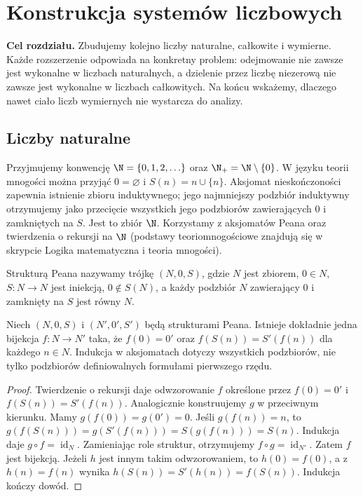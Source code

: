 \chapter{Konstrukcja systemów liczbowych}
\label{ma1:ch:number-systems}
\textbf{Cel rozdziału.} Zbudujemy kolejno liczby naturalne, całkowite i wymierne. Każde rozszerzenie odpowiada na konkretny problem: odejmowanie nie zawsze jest wykonalne w liczbach naturalnych, a dzielenie przez liczbę niezerową nie zawsze jest wykonalne w liczbach całkowitych. Na końcu wskażemy, dlaczego nawet ciało liczb wymiernych nie wystarcza do analizy.

\section{Liczby naturalne}
\label{ma1:sec:naturals}
Przyjmujemy konwencję $\N=\{0,1,2,\ldots\}$ oraz $\N_+=\N\setminus\{0\}$.
W języku teorii mnogości można przyjąć $0=\varnothing$ i $S(n)=n\cup\{n\}$. Aksjomat nieskończoności zapewnia istnienie zbioru induktywnego; jego najmniejszy podzbiór induktywny otrzymujemy jako przecięcie wszystkich jego podzbiorów zawierających $0$ i zamkniętych na $S$. Jest to zbiór $\N$. Korzystamy z aksjomatów Peana oraz twierdzenia o rekursji na $\N$ (podstawy teoriomnogościowe znajdują się w skrypcie Logika matematyczna i teoria mnogości).
\begin{definicja}
\label{ma1:def:peano}
Strukturą Peana nazywamy trójkę $(N,0,S)$, gdzie $N$ jest zbiorem, $0\in N$, $S\colon N\to N$ jest iniekcją, $0\notin S(N)$, a każdy podzbiór $N$ zawierający $0$ i zamknięty na $S$ jest równy $N$.
\end{definicja}
\begin{twierdzenie}
Niech $(N,0,S)$ i $(N',0',S')$ będą strukturami Peana. Istnieje dokładnie jedna bijekcja $f\colon N\to N'$ taka, że $f(0)=0'$ oraz $f(S(n))=S'(f(n))$ dla każdego $n\in N$. Indukcja w aksjomatach dotyczy wszystkich podzbiorów, nie tylko podzbiorów definiowalnych formułami pierwszego rzędu.
\end{twierdzenie}
\begin{proof}
Twierdzenie o rekursji daje odwzorowanie $f$ określone przez $f(0)=0'$ i $f(S(n))=S'(f(n))$. Analogicznie konstruujemy $g$ w przeciwnym kierunku. Mamy $g(f(0))=g(0')=0$. Jeśli $g(f(n))=n$, to $g(f(S(n)))=g(S'(f(n)))=S(g(f(n)))=S(n)$. Indukcja daje $g\circ f=\operatorname{id}_N$. Zamieniając role struktur, otrzymujemy $f\circ g=\operatorname{id}_{N'}$. Zatem $f$ jest bijekcją. Jeżeli $h$ jest innym takim odwzorowaniem, to $h(0)=f(0)$, a z $h(n)=f(n)$ wynika $h(S(n))=S'(h(n))=f(S(n))$. Indukcja kończy dowód.
\end{proof}

